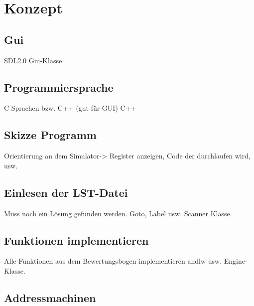 \section{Konzept}

\subsection{Gui}
SDL2.0
Gui-Klasse


\subsection{Programmiersprache}
C Sprachen bzw. C++ (gut für GUI)
C++

\subsection{Skizze Programm}

Orientierung an dem Simulator-> Register anzeigen, Code der durchlaufen wird, usw.

\subsection{Einlesen der LST-Datei}
Muss noch ein Lösung gefunden werden.
Goto, Label usw.
Scanner Klasse.

\subsection{Funktionen implementieren}
Alle Funktionen aus dem Bewertungsbogen implementieren andlw usw. 
Engine-Klasse.

\subsection{Addressmachinen}
